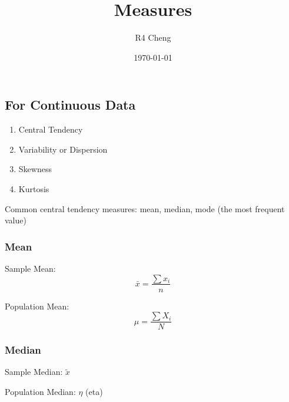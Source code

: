 \documentclass[12pt,a4paper]{article}
\title{Measures}
\author{R4 Cheng}
\date{\today}
\begin{document}
\maketitle

\subsection*{For Continuous Data}

\begin{enumerate}
    \item Central Tendency
    \item Variability or Dispersion
    \item Skewness
    \item Kurtosis
\end{enumerate}


Common central tendency measures: mean, median, mode (the most frequent value)

\subsubsection*{Mean}

Sample Mean:
\[
\bar{x} = \frac{\sum x_i}{n}
\]

Population Mean:
\[
\mu = \frac{\sum X_i}{N}
\]

\subsubsection*{Median}

Sample Median: $\tilde{x}$

Population Median: $\eta$ (eta)
\end{document}
